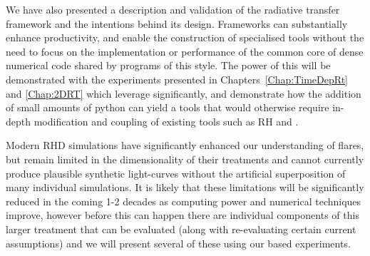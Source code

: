 We have also presented a description and validation of the \Lw{} radiative transfer framework and the intentions behind its design.
Frameworks can substantially enhance productivity, and enable the construction of specialised tools without the need to focus on the implementation or performance of the common core of dense numerical code shared by programs of this style.
The power of this will be demonstrated with the experiments presented in Chapters~\ref{Chap:TimeDepRt} and \ref{Chap:2DRT} which leverage \Lw{} significantly, and demonstrate how the addition of small amounts of python can yield a tools that would otherwise require in-depth modification and coupling of existing tools such as RH and \Radyn{}.

Modern RHD simulations have significantly enhanced our understanding of flares, but remain limited in the dimensionality of their treatments and cannot currently produce plausible synthetic light-curves without the artificial superposition of many individual simulations.
It is likely that these limitations will be significantly reduced in the coming 1-2 decades as computing power and numerical techniques improve, however before this can happen there are individual components of this larger treatment that can be evaluated (along with re-evaluating certain current assumptions) and we will present several of these using our \Lw{} based experiments.
